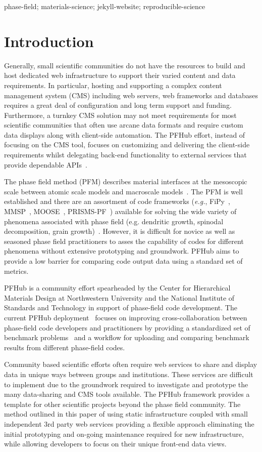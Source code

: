 \documentclass{jors}
\begin{document}
phase-field; materials-science; jekyll-website; reproducible-science

\section*{Introduction}

Generally, small scientific communities do not have the resources to
build and host dedicated web infrastructure to support their varied
content and data requirements. In particular, hosting and supporting a
complex content management system (CMS) including web servers, web
frameworks and databases requires a great deal of configuration and
long term support and funding. Furthermore, a turnkey CMS solution may
not meet requirements for most scientific communities that often use
arcane data formats and require custom data displays along with
client-side automation. The PFHub effort, instead of focusing on the
CMS tool, focuses on customizing and delivering the client-side
requirements whilst delegating back-end functionality to external
services that provide dependable APIs~\cite{cmsfree}.

The phase field method (PFM) describes material interfaces at the
mesoscopic scale between atomic scale models and macroscale
models~\cite{MOELANS2008268}. The PFM is well established and there
are an assortment of code frameworks (\emph{e.g.}, FiPy~\cite{fipy},
MMSP~\cite{mmsp}, MOOSE~\cite{moose}, PRISMS-PF~\cite{prisms-pf})
available for solving the wide variety of phenomena associated with
phase field (e.g. dendritic growth, spinodal decomposition, grain
growth)~\cite{tonks}. However, it is difficult for novice as well as
seasoned phase field practitioners to asses the capability of codes
for different phenomena without extensive prototyping and
groundwork. PFHub aims to provide a low barrier for comparing code
output data using a standard set of metrics.

PFHub is a community effort spearheaded by the Center for Hierarchical
Materials Design at Northwestern University and the National Institute
of Standards and Technology in support of phase-field code
development. The current PFHub deployment~\cite{pfhub} focuses on
improving cross-collaboration between phase-field code developers and
practitioners by providing a standardized set of benchmark
problems~\cite{bm1, bm2} and a workflow for uploading and comparing
benchmark results from different phase-field codes.

Community based scientific efforts often require web services to share
and display data in unique ways between groups and institutions. These
services are difficult to implement due to the groundwork required to
investigate and prototype the many data-sharing and CMS tools
available. The PFHub framework provides a template for other
scientific projects beyond the phase field community. The method
outlined in this paper of using static infrastructure coupled with
small independent 3rd party web services providing a flexible approach
eliminating the initial prototyping and on-going maintenance required
for new infrastructure, while allowing developers to focus on their
unique front-end data views.
\end{document}
